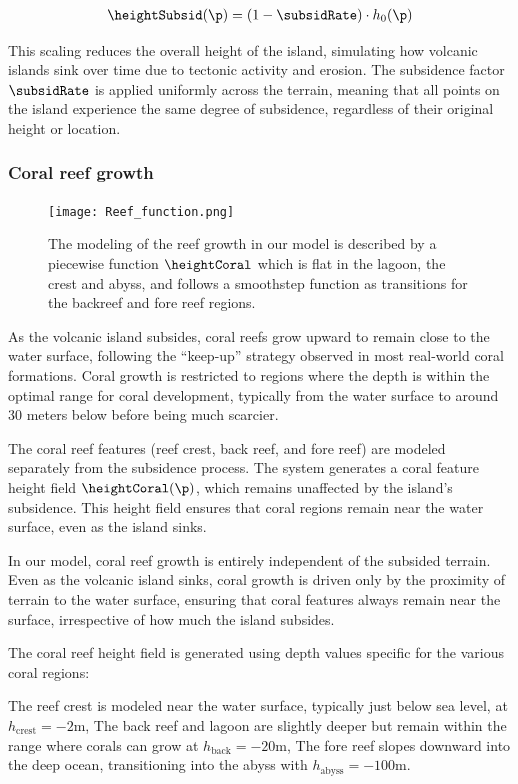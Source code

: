 \begin{align}
    \heightSubsid(\p) = (1 - \subsidRate) \cdot h_0(\p)
\end{align}

This scaling reduces the overall height of the island, simulating how volcanic islands sink over time due to tectonic activity and erosion. The subsidence factor $\subsidRate$ is applied uniformly across the terrain, meaning that all points on the island experience the same degree of subsidence, regardless of their original height or location.

\subsubsection{Coral reef growth}
\label{sec:coral-island_reef-growth}

\begin{figure}[H]
    \texttt{[image: Reef\_function.png]}
    \caption{The modeling of the reef growth in our model is described by a piecewise function $\heightCoral$ which is flat in the lagoon, the crest and abyss, and follows a smoothstep function as transitions for the backreef and fore reef regions. }
    \label{fig:coral-island_reef-function}
\end{figure}

As the volcanic island subsides, coral reefs grow upward to remain close to the water surface, following the “keep-up” strategy observed in most real-world coral formations. Coral growth is restricted to regions where the depth is within the optimal range for coral development, typically from the water surface to around 30 meters below before being much scarcier.

The coral reef features (reef crest, back reef, and fore reef) are modeled separately from the subsidence process. The system generates a coral feature height field $\heightCoral(\p)$, which remains unaffected by the island's subsidence. This height field ensures that coral regions remain near the water surface, even as the island sinks.

In our model, coral reef growth is entirely independent of the subsided terrain. Even as the volcanic island sinks, coral growth is driven only by the proximity of terrain to the water surface, ensuring that coral features always remain near the surface, irrespective of how much the island subsides.

    The coral reef height field is generated using depth values specific for the various coral regions:
    \begin{Itemize}
        \Item{} The reef crest is modeled near the water surface, typically just below sea level, at $h_\text{crest} = -2$m,
        \Item{} The back reef and lagoon are slightly deeper but remain within the range where corals can grow at $h_\text{back} = -20$m,
        \Item{} The fore reef slopes downward into the deep ocean, transitioning into the abyss with $h_\text{abyss} = -100$m.
    \end{Itemize}

